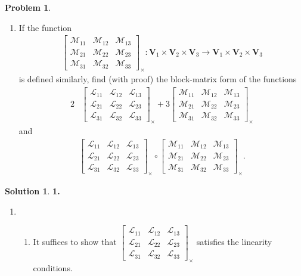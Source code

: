\documentclass{article}
\theoremstyle{definition}
\newtheorem*{prob*}{Problem}
\newtheorem*{sln*}{Solution}
\newcommand{\V}{\mathbf{V}}
\newcommand{\lag}{\mathcal{L}}
\newcommand{\M}{\mathcal{M}}
\begin{document}
\begin{prob*}
\begin{enumerate}
		\item If the function
		\begin{align*}
		\begin{bmatrix}
		\M_{11} & \M_{12} & \M_{13}\\
		\M_{21} & \M_{22} & \M_{23}\\
		\M_{31} & \M_{32} & \M_{33}
		\end{bmatrix}_\times : \V_1 \times \V_2 \times \V_3 \to \V_1\times\V_2\times \V_3
		\end{align*}
		is defined similarly, find (with proof) the block-matrix form of the functions
		\begin{align*}
		2&\begin{bmatrix}
		\lag_{11} & \lag_{12} & \lag_{13}\\
		\lag_{21} & \lag_{22} & \lag_{23}\\
		\lag_{31} & \lag_{32} & \lag_{33}
		\end{bmatrix}_\times 
		+ 
		3\begin{bmatrix}
		\M_{11} & \M_{12} & \M_{13}\\
		\M_{21} & \M_{22} & \M_{23}\\
		\M_{31} & \M_{32} & \M_{33}
		\end{bmatrix}_\times 
		\end{align*}
		and
		\begin{align*}
		\begin{bmatrix}
		\lag_{11} & \lag_{12} & \lag_{13}\\
		\lag_{21} & \lag_{22} & \lag_{23}\\
		\lag_{31} & \lag_{32} & \lag_{33}
		\end{bmatrix}_\times
		\circ 
		\begin{bmatrix}
		\M_{11} & \M_{12} & \M_{13}\\
		\M_{21} & \M_{22} & \M_{23}\\
		\M_{31} & \M_{32} & \M_{33}
		\end{bmatrix}_\times.
		\end{align*}
	\end{enumerate}
	
	\newpage
	
	\begin{sln*}\textbf{1. }
		\begin{enumerate}
			\item 
			\begin{enumerate}
			\item It suffices to show that $\begin{bmatrix}
			\lag_{11} & \lag_{12} & \lag_{13}\\
			\lag_{21} & \lag_{22} & \lag_{23}\\
			\lag_{31} & \lag_{32} & \lag_{33}
			\end{bmatrix}_\times$ satisfies the linearity conditions.\\
			

\end{enumerate}
\end{enumerate}
\end{sln*}
\end{prob*}
\end{document}
